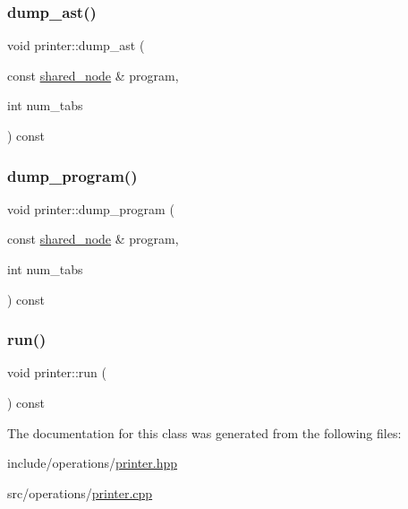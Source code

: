 \subsubsection{\texorpdfstring{dump\+\_\+ast()}{dump\_ast()}}
{\footnotesize\ttfamily void printer\+::dump\+\_\+ast (\begin{DoxyParamCaption}\item[{const \hyperlink{namespacejawe_a3f307481d921b6cbb50cc8511fc2b544}{shared\+\_\+node} \&}]{program,  }\item[{int}]{num\+\_\+tabs }\end{DoxyParamCaption}) const\hspace{0.3cm}{\ttfamily [private]}}

\mbox{\label{classjawe_1_1printer_ab2889decb6c7f8747dc7889c5ee16e64}} 
\subsubsection{\texorpdfstring{dump\+\_\+program()}{dump\_program()}}
{\footnotesize\ttfamily void printer\+::dump\+\_\+program (\begin{DoxyParamCaption}\item[{const \hyperlink{namespacejawe_a3f307481d921b6cbb50cc8511fc2b544}{shared\+\_\+node} \&}]{program,  }\item[{int}]{num\+\_\+tabs }\end{DoxyParamCaption}) const\hspace{0.3cm}{\ttfamily [private]}}

\mbox{\label{classjawe_1_1printer_a0405800fc94e5dc738a5ba991822a086}} 
\subsubsection{\texorpdfstring{run()}{run()}}
{\footnotesize\ttfamily void printer\+::run (\begin{DoxyParamCaption}{ }\end{DoxyParamCaption}) const}



The documentation for this class was generated from the following files\+:\begin{DoxyCompactItemize}
\item 
include/operations/\hyperlink{printer_8hpp}{printer.\+hpp}\item 
src/operations/\hyperlink{printer_8cpp}{printer.\+cpp}\end{DoxyCompactItemize}
